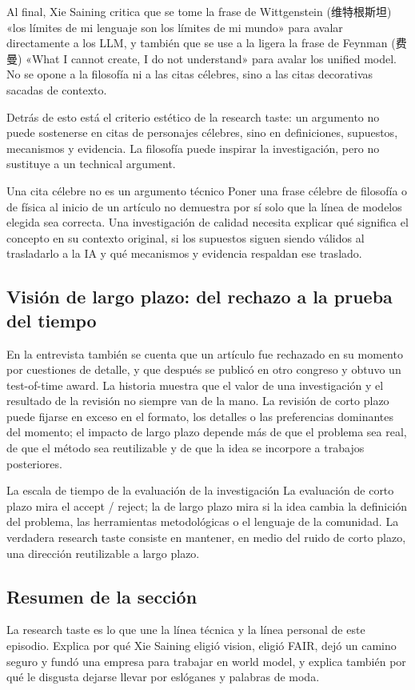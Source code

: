 Al final, Xie Saining critica que se tome la frase de Wittgenstein (维特根斯坦) «los límites de mi lenguaje son los límites de mi mundo» para avalar directamente a los LLM, y también que se use a la ligera la frase de Feynman (费曼) «What I cannot create, I do not understand» para avalar los unified model. No se opone a la filosofía ni a las citas célebres, sino a las citas decorativas sacadas de contexto.

Detrás de esto está el criterio estético de la research taste: un argumento no puede sostenerse en citas de personajes célebres, sino en definiciones, supuestos, mecanismos y evidencia. La filosofía puede inspirar la investigación, pero no sustituye a un technical argument.

\begin{warningbox}{Una cita célebre no es un argumento técnico}
Poner una frase célebre de filosofía o de física al inicio de un artículo no demuestra por sí solo que la línea de modelos elegida sea correcta. Una investigación de calidad necesita explicar qué significa el concepto en su contexto original, si los supuestos siguen siendo válidos al trasladarlo a la IA y qué mecanismos y evidencia respaldan ese traslado.
\end{warningbox}

\subsection{Visión de largo plazo: del rechazo a la prueba del tiempo}

En la entrevista también se cuenta que un artículo fue rechazado en su momento por cuestiones de detalle, y que después se publicó en otro congreso y obtuvo un test-of-time award. La historia muestra que el valor de una investigación y el resultado de la revisión no siempre van de la mano. La revisión de corto plazo puede fijarse en exceso en el formato, los detalles o las preferencias dominantes del momento; el impacto de largo plazo depende más de que el problema sea real, de que el método sea reutilizable y de que la idea se incorpore a trabajos posteriores.

\begin{importantbox}{La escala de tiempo de la evaluación de la investigación}
La evaluación de corto plazo mira el accept / reject; la de largo plazo mira si la idea cambia la definición del problema, las herramientas metodológicas o el lenguaje de la comunidad. La verdadera research taste consiste en mantener, en medio del ruido de corto plazo, una dirección reutilizable a largo plazo.
\end{importantbox}

\subsection{Resumen de la sección}

La research taste es lo que une la línea técnica y la línea personal de este episodio. Explica por qué Xie Saining eligió vision, eligió FAIR, dejó un camino seguro y fundó una empresa para trabajar en world model, y explica también por qué le disgusta dejarse llevar por eslóganes y palabras de moda.
